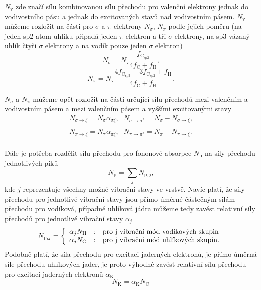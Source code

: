 $N_\mathrm{v}$ zde značí sílu kombinovanou sílu přechodu pro valenční elektrony jednak do vodivostního pásu a jednak do excitovaných stavů nad vodivostním pásem. $N_\mathrm{v}$ můžeme rozložit na části pro $\sigma$ a $\pi$ elektrony $N_\sigma$, $N_\pi$ podle jejich poměru (na jeden sp2 atom uhlíku připadá jeden $\pi$ elektron a tři $\sigma$ elektrony, na sp3 vázaný uhlík čtyři $\sigma$ elektrony a na vodík pouze jeden $\sigma$  elektron)
\begin{equation}
N_\sigma = N_\mathrm{v} \frac{f_\mathrm{C_{sp2}}}{4f_\mathrm{C} + f_\mathrm{H}}  \text{,}
\end{equation}
\begin{equation}
N_\pi = N_\mathrm{v} \frac{4f_\mathrm{C_{sp3}} + 3f_\mathrm{C_{sp2}} + f_\mathrm{H}}{4f_\mathrm{C} + f_\mathrm{H}}  \text{.}
\end{equation}

$N_\sigma$ a $N_\pi$ můžeme opět rozložit na části určující sílu přechodů mezi valenčním a vodivostním pásem a mezi valenčním pásem a vyššími excitovanými stavy
\begin{equation}
\begin{array}{lr}
N_{\sigma \rightarrow \xi} = N_\mathrm{\sigma} \alpha_{\sigma\xi} \text{,} &
N_{\sigma \rightarrow \sigma^*} = N_\sigma - N_{\sigma \rightarrow \xi} \text{,} \\
\end{array}
\end{equation}
\begin{equation}
\begin{array}{lr}
N_{\pi \rightarrow \xi} = N_\mathrm{\pi} \alpha_{\pi\xi} \text{,} &
N_{\pi \rightarrow \pi^*} = N_\pi - N_{\pi \rightarrow \xi} \text{.} \\
\end{array}
\end{equation}

Dále je potřeba rozdělit sílu přechodu pro fononové absorpce $N_\mathrm{p}$ na síly přechodu jednotlivých píků
\begin{equation}
N_\mathrm{p} = \sum_j N_{\mathrm{p},j} \text{,}
\end{equation}
kde $j$ reprezentuje všechny možné vibrační stavy ve vrstvě. Navíc platí, že síly přechodu pro jednotlivé vibrační stavy jsou přímo úměrné částečným silám přechodu pro vodíková, případně uhlíková jádra můžeme tedy zavést relativní síly přechodů pro jednotlivé vibrační stavy $\alpha_j$
\begin{equation}
N_{\mathrm{p},j} = 
	\left\{\begin{array}{l c l} 
	\alpha_j N_\mathrm{H} & : & \text{pro j vibrační mód vodíkových skupin} \\
	\alpha_j N_\mathrm{C} & : & \text{pro j vibrační mód uhlíkových skupin.}\end{array} \right.
\end{equation}
Podobně platí, že síla přechodu pro excitaci jaderných elektronů, je přímo úměrná síle přechodu uhlíkových jader, je proto výhodné zavést relativní sílu přechodu pro excitaci jaderných elektronů $\alpha_\mathrm{K}$
\begin{equation}
N_\mathrm{K} =  \alpha_\mathrm{K} N_\mathrm{C}
\end{equation}

